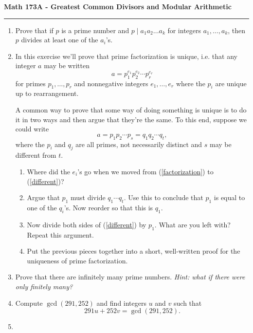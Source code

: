 \documentclass[11pt,letterpaper]{article}
\begin{document}
\begin{center}
{\bf \Large Math 173A - Greatest Common Divisors and Modular Arithmetic}
\vspace{0.2cm}
\hrule
\end{center}

\begin{enumerate}

    \item Prove that if $p$ is a prime number and $p\mid a_1a_2\ldots a_k$ for integers $a_1, \ldots, a_k$, then $p$ divides at least one of the $a_i$'s.


    \item In this exercise we'll prove that prime factorization is unique, i.e. that any integer $a$ may be written
    \begin{equation}\label{factorization}
        a = p_1^{e_1}p_2^{e_2}\cdots p_r^{e_r}
    \end{equation}
    for primes $p_1, \ldots, p_r$ and nonnegative integers $e_1, \ldots, e_r$ where the $p_i$ are unique up to rearrangement.

    A common way to prove that some way of doing something is unique is to do it in two ways and then argue that they're the same.
    To this end, suppose we could write
    \begin{equation}\label{different}
        a = p_1p_2\cdots p_s = q_1q_2\cdots q_t,
    \end{equation}
    where the $p_i$ and $q_j$ are all primes, not necessarily distinct and $s$ may be different from $t$.
    \begin{enumerate}
        \item Where did the $e_i$'s go when we moved from (\ref{factorization}) to (\ref{different})?


        \item Argue that $p_1$ must divide $q_1\cdots q_t$. Use this to conclude that $p_1$ is equal to one of the $q_i$'s. Now reorder so that this is $q_1$.

        \item Now divide both sides of (\ref{different}) by $p_1$. What are you left with? Repeat this argument.

        \item Put the previous pieces together into a short, well-written proof for the uniqueness of prime factorization.
    \end{enumerate}
    

    \item Prove that there are infinitely many prime numbers. \emph{Hint: what if there were only finitely many?}

    \item Compute $\gcd(291, 252)$ and find integers $u$ and $v$ such that
    \[
        291u + 252v = \gcd(291, 252).
    \]

    \item 
\end{enumerate}
\end{document}
